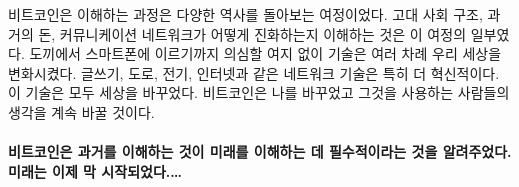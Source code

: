 \begin{comment}
My quest of trying to make sense of Bitcoin has led me down the pathways
of history in more ways than one. Understanding ancient societal
structures, past monies, and how communication networks evolved were all
part of the journey. From the handaxe to the smartphone, technology has
undoubtedly changed our world many times over. Networked technologies
are especially transformational: writing, roads, electricity, the
internet. All of them changed the world. Bitcoin has changed mine and
will continue to change the minds and hearts of those who dare to use
it.
\end{comment}
비트코인은 이해하는 과정은 다양한 역사를 돌아보는 여정이었다.
고대 사회 구조, 과거의 돈, 커뮤니케이션 네트워크가 어떻게 진화하는지 이해하는 것은 
이 여정의 일부였다.
도끼에서 스마트폰에 이르기까지 의심할 여지 없이 기술은 여러 차례 우리 세상을 변화시켰다.
글쓰기, 도로, 전기, 인터넷과 같은 네트워크 기술은 특히 더 혁신적이다.
이 기술은 모두 세상을 바꾸었다. 
비트코인은 나를 바꾸었고 그것을 사용하는 사람들의 생각을 계속 바꿀 것이다.

\paragraph{비트코인은 과거를 이해하는 것이 미래를 이해하는 데 필수적이라는 것을 알려주었다. 미래는 이제 막 시작되었다.\ldots}


